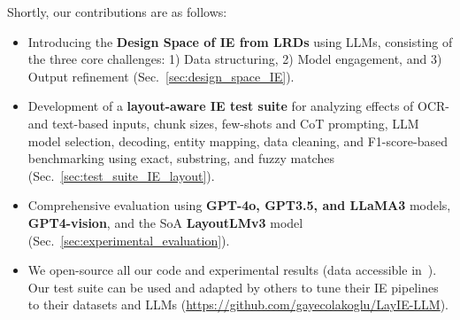 \noindent Shortly, our contributions are as follows:

\begin{itemize}[leftmargin=*,noitemsep,topsep=0pt]

\item Introducing the \textbf{Design Space of IE from LRDs} using LLMs, consisting of the three core challenges: 1) Data structuring, 2) Model engagement, and 3) Output refinement  (Sec.~\ref{sec:design_space_IE}).

\item Development of a \textbf{layout-aware IE test suite} for analyzing effects of OCR- and text-based inputs, chunk sizes, few-shots and CoT prompting, LLM model selection, decoding, entity mapping, data cleaning, and F1-score-based benchmarking using exact, substring, and fuzzy matches
(Sec.~\ref{sec:test_suite_IE_layout}).

\item   Comprehensive evaluation using \textbf{GPT-4o, GPT3.5, and LLaMA3} models, \textbf{GPT4-vision}, and the SoA \textbf{LayoutLMv3} model (Sec.~\ref{sec:experimental_evaluation}).

\item We open-source all our code and experimental results (data accessible in~\cite{wang2023vrdu}). Our test suite can be used and adapted by others to tune their IE pipelines to their datasets and LLMs (\url{https://github.com/gayecolakoglu/LayIE-LLM}).

\end{itemize}


